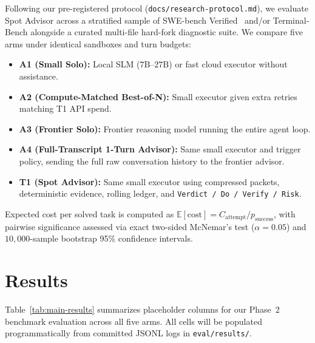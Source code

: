 \documentclass[11pt]{article}
\begin{document}
Following our pre-registered protocol (\texttt{docs/research-protocol.md}), we evaluate Spot Advisor across a stratified sample of SWE-bench Verified~\citep{jimenez2024swebench} and/or Terminal-Bench alongside a curated multi-file hard-fork diagnostic suite. We compare five arms under identical sandboxes and turn budgets:
\begin{itemize}
    \item \textbf{A1 (Small Solo):} Local SLM ($7\text{B}\text{--}27\text{B}$) or fast cloud executor without assistance.
    \item \textbf{A2 (Compute-Matched Best-of-N):} Small executor given extra retries matching T1 API spend.
    \item \textbf{A3 (Frontier Solo):} Frontier reasoning model running the entire agent loop.
    \item \textbf{A4 (Full-Transcript 1-Turn Advisor):} Same small executor and trigger policy, sending the full raw conversation history to the frontier advisor.
    \item \textbf{T1 (Spot Advisor):} Same small executor using compressed packets, deterministic evidence, rolling ledger, and \texttt{Verdict / Do / Verify / Risk}.
\end{itemize}
Expected cost per solved task is computed as $\mathbb{E}[\text{cost}] = C_{\text{attempt}} / p_{\text{success}}$, with pairwise significance assessed via exact two-sided McNemar's test ($\alpha = 0.05$) and $10{,}000$-sample bootstrap 95\% confidence intervals.

\section{Results}
\label{sec:results}

Table~\ref{tab:main-results} summarizes placeholder columns for our Phase~2 benchmark evaluation across all five arms. All cells will be populated programmatically from committed JSONL logs in \texttt{eval/results/}.
\end{document}
